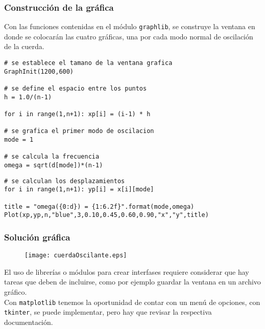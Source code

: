 \begin{frame}
\frametitle{Construcción de la gráfica}
Con las funciones contenidas en el módulo \texttt{graphlib}, se construye la ventana en donde se colocarán las cuatro gráficas, una por cada modo normal de oscilación de la cuerda.
\end{frame}
\begin{frame}[fragile]
\begin{lstlisting}[basicstyle=\linespread{0.9}\ttfamily\normalsize, columns=fullflexible]
# se establece el tamano de la ventana grafica
GraphInit(1200,600)

# se define el espacio entre los puntos
h = 1.0/(n-1)

for i in range(1,n+1): xp[i] = (i-1) * h

# se grafica el primer modo de oscilacion
mode = 1

# se calcula la frecuencia
omega = sqrt(d[mode])*(n-1)
\end{lstlisting}
\end{frame}
\begin{frame}[fragile]
\begin{lstlisting}[basicstyle=\linespread{0.9}\ttfamily\normalsize, columns=fullflexible]
# se calculan los desplazamientos
for i in range(1,n+1): yp[i] = x[i][mode]

title = "omega({0:d}) = {1:6.2f}".format(mode,omega)
Plot(xp,yp,n,"blue",3,0.10,0.45,0.60,0.90,"x","y",title)
\end{lstlisting}
\end{frame}
\begin{frame}
\frametitle{Solución gráfica}
\begin{figure}
	\centering
	\texttt{[image: cuerdaOscilante.eps]}
\end{figure}
\end{frame}
\begin{frame}
El uso de librerías o módulos para crear interfases requiere considerar que hay tareas que deben de incluirse, como por ejemplo guardar la ventana en un archivo gráfico.
\\
\bigskip
Con \texttt{matplotlib} tenemos la oportunidad de contar con un menú de opciones, con \texttt{tkinter}, se puede implementar, pero hay que revisar la respectiva documentación.
\end{frame}
